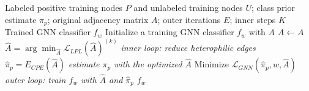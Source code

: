 \documentclass{article}
\begin{document}
\begin{algorithm}[!h]
\renewcommand{\algorithmicrequire}{\textbf{Input:}} %
\renewcommand{\algorithmicensure}{\textbf{Output:}} %
	\caption{GPL (graph PU learning with label propagation loss)} %
	\begin{algorithmic}[1] %
	    \REQUIRE
	    Labeled positive training nodes $P$ and unlabeled training nodes $U$;
	    class prior estimate $\pi_{p}$; original adjacency matrix $A$;
	    outer iterations $E$; inner steps $K$
	    \ENSURE
	    Trained GNN classifier $f_{w}$
	    \STATE Initialize a training GNN classifier $f_{w}$ with $A$
	    \STATE $\hat{A}\leftarrow A$
	    \STATE $\hat{A}=\arg\min_{\hat{A}}\mathcal{L}_{LPL}(\hat{A})^{(k)}$
	    \hfill \emph{inner loop: reduce heterophilic edges} %
	    \ENDWHILE
	    \STATE $\hat{\pi}_{p}=E_{CPE}(\hat{A})$
	    \hfill \emph{estimate $\pi_{p}$ with the optimized $\hat{A}$} %
	    \STATE Minimize $\mathcal{L}_{GNN}(\hat{\pi}_{p},w,\hat{A})$
	    \hfill \emph{outer loop: train $f_{w}$ with $\hat{A}$ and $\hat{\pi}_{p}$}
	    \ENDFOR
		\RETURN $f_{w}$
	\end{algorithmic}
\end{algorithm}
\end{document}
